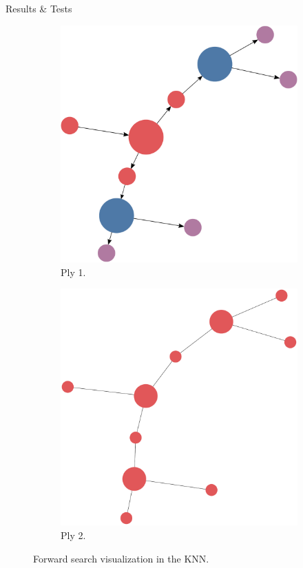 \documentclass[final]{beamer} %
\begin{document}
\begin{frame}
\begin{columns}
\begin{column}{.33\textwidth}
{\begin{block}{Results \& Tests}
\begin{figure}
\begin{subfigure}[!htb]{0.32\columnwidth}
							\includegraphics[width=\columnwidth]{figures/knn_simple_forward_think_1.pdf}
							\caption{Ply 1.}
						\end{subfigure}
						\begin{subfigure}[!htb]{0.32\columnwidth}
							\centering
							\includegraphics[width=\columnwidth]{figures/knn_simple_forward_think_2.pdf}
							\caption{Ply 2.}
						\end{subfigure}
						\caption{Forward search visualization in the KNN.}
						\label{fig:forward_search_test}
					\end{figure}
					

\end{block}}
\end{column}
\end{columns}
\end{frame}
\end{document}
